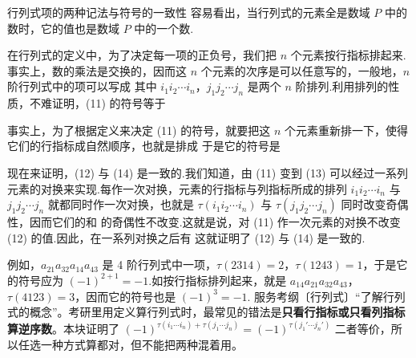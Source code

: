 \begin{fdeep}{行列式项的两种记法与符号的一致性}
容易看出，当行列式的元素全是数域 $P$ 中的数时，它的值也是数域 $P$ 中的一个数.

在行列式的定义中，为了决定每一项的正负号，我们把 $n$ 个元素按行指标排起来.事实上，数的乘法是交换的，因而这 $n$ 个元素的次序是可以任意写的，一般地，$n$ 阶行列式中的项可以写成
其中 $i_1i_2\cdots i_n$，$j_1j_2\cdots j_n$ 是两个 $n$ 阶排列.利用排列的性质，不难证明，(11) 的符号等于

事实上，为了根据定义来决定 (11) 的符号，就要把这 $n$ 个元素重新排一下，使得它们的行指标成自然顺序，也就是排成
于是它的符号是

现在来证明，(12) 与 (14) 是一致的.我们知道，由 (11) 变到 (13) 可以经过一系列元素的对换来实现.每作一次对换，元素的行指标与列指标所成的排列 $i_1i_2\cdots i_n$ 与 $j_1j_2\cdots j_n$ 就都同时作一次对换，也就是 $\tau(i_1i_2\cdots i_n)$ 与 $\tau(j_1j_2\cdots j_n)$ 同时改变奇偶性，因而它们的和
的奇偶性不改变.这就是说，对 (11) 作一次元素的对换不改变 (12) 的值.因此，在一系列对换之后有
这就证明了 (12) 与 (14) 是一致的.

例如，$a_{21}a_{32}a_{14}a_{43}$ 是 4 阶行列式中一项，$\tau(2314)=2$，$\tau(1243)=1$，于是它的符号应为 $(-1)^{2+1}=-1$.如按行指标排列起来，就是 $a_{14}a_{21}a_{32}a_{43}$，$\tau(4123)=3$，因而它的符号也是 $(-1)^{3}=-1$.
\fbref{}服务考纲〔行列式〕“了解行列式的概念”。考研里用定义算行列式时，最常见的错法是\textbf{只看行指标或只看列指标算逆序数}。本块证明了 $(-1)^{\tau(i_1\cdots i_n)+\tau(j_1\cdots j_n)}=(-1)^{\tau(j_1'\cdots j_n')}$ 二者等价，所以任选一种方式算都对，但不能把两种混着用。
\end{fdeep}

